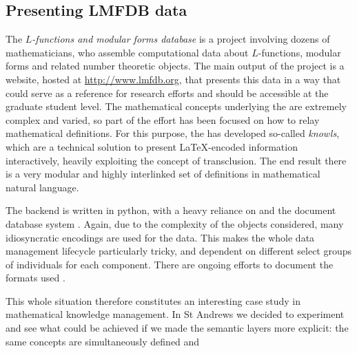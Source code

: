 \subsection{Presenting LMFDB data}
The \emph{$L$-functions and modular forms database} is a project involving dozens of 
mathematicians, who assemble computational data about $L$-functions, modular 
forms and related number theoretic objects. The main output of the project is a 
website, hosted at \url{http://www.lmfdb.org}, that presents this data in a way that could serve as a reference for research efforts and should be accessible at the graduate student level.  The mathematical concepts underlying the \LMFDB are extremely complex and varied, so part of the effort has been focused on how to relay mathematical definitions. For this purpose, the \LMFDB has developed so-called \emph{knowls}, which are a technical solution to present \LaTeX-encoded information interactively, heavily exploiting the concept of transclusion. The end result there is a very modular and highly interlinked set of definitions in mathematical natural language. 
 
The \LMFDB backend is written in \textsf{python}, with a heavy reliance on \Sage and the document database system \Mongo \cite{lmfdb-repo}. Again, due to the complexity of the objects considered, many idiosyncratic encodings are used for the data. This makes the whole data management lifecycle particularly tricky, and dependent on different select groups of individuals for each component. There are ongoing efforts to document the formats used \cite{lmfdb-formats}.

This whole situation therefore constitutes an interesting case study in mathematical knowledge management. In St Andrews we decided to experiment and see what could be achieved if we made the semantic layers more explicit: the same concepts are simultaneously defined and 
